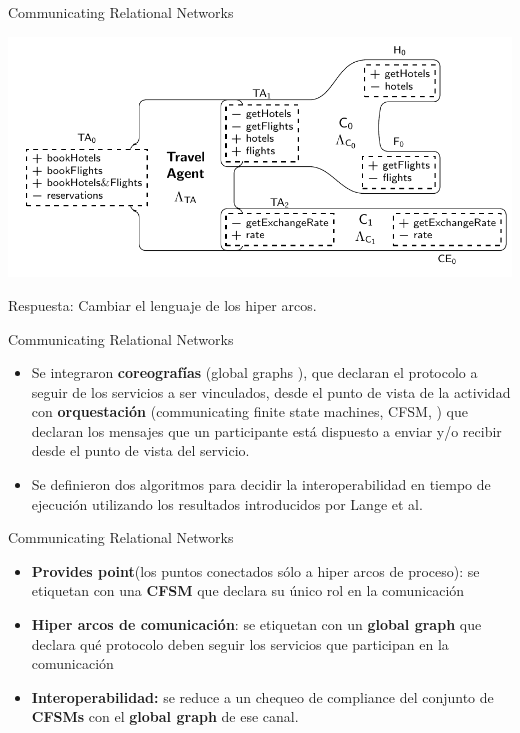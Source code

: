 \documentclass[10pt,xcolor={table,dvipsnames},t]{beamer}
\begin{document}
\begin{frame}{Communicating Relational Networks \cite{vissani:places15}}
\begin{center}
    \includegraphics[scale=0.5]{images/ARN0.png}
\end{center}
Respuesta: Cambiar el lenguaje de los hiper arcos.
\end{frame}


\begin{frame}{Communicating Relational Networks \cite{vissani:places15}}
\begin{itemize}
    \item Se integraron \textbf{coreografías} (global graphs \cite{denielou:esop12}), que declaran el protocolo a seguir de los servicios a ser vinculados, desde el punto de vista de la actividad con \textbf{orquestación} (communicating finite state machines, CFSM, \cite{brand:jacm-30_2}) que declaran los mensajes que un participante está dispuesto a enviar y/o recibir desde el punto de vista del servicio.

    \item Se definieron dos algoritmos para decidir la interoperabilidad en tiempo de ejecución utilizando los resultados introducidos por Lange et al. \cite{lange:popl15}
\end{itemize}
\end{frame}

\begin{frame}{Communicating Relational Networks}
\begin{itemize}
    \item \textbf{Provides point}(los puntos conectados sólo a hiper arcos de proceso): se etiquetan con una \textbf{CFSM} que declara su único rol en la comunicación
    \item \textbf{Hiper arcos de comunicación}: se etiquetan con un \textbf{global graph} que declara qué protocolo deben seguir los servicios que participan en la comunicación
    \item \textbf{Interoperabilidad:} se reduce a un chequeo de compliance del conjunto de \textbf{CFSMs} con el \textbf{global graph} de ese canal.
\end{itemize}
\end{frame}
\end{document}
